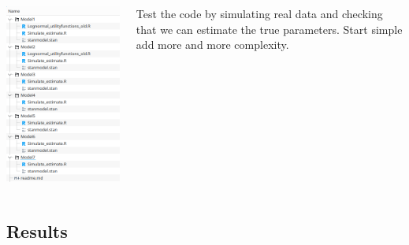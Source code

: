 \documentclass[usenames,dvipsnames]{beamer}
\begin{document}
\begin{frame}
\begin{columns}
\begin{column}[c]{0.49\textwidth}
   \includegraphics[width=0.50\textheight]{./plots/Model_testing}
\end{column}
\begin{column}[c]{0.40\textwidth}
Test the code by simulating real data and checking that we can estimate the true parameters.
Start simple add more and more complexity.
\end{column}
\end{columns}
\end{frame}



\subsection{Results}

\begin{frame}[t]
  \tableofcontents[currentsubsection]
\end{frame}
\end{document}
